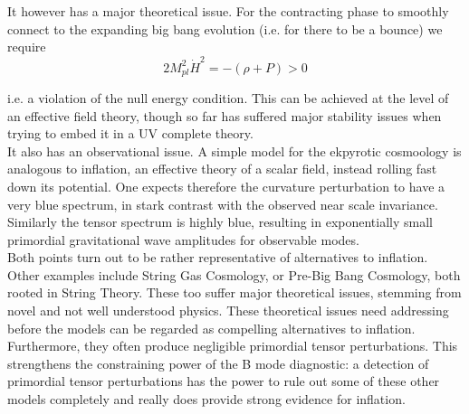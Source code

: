 \documentclass[a4paper,10pt]{article}
\newcommand{\Mp}{M_{pl}}
\begin{document}
It however has a major theoretical issue. For the contracting phase to smoothly connect to the expanding big bang evolution (i.e. for there to be a bounce) we require
\begin{equation}
2\Mp^2\dot{H}^2 = -(\rho + P) > 0
\end{equation} 

i.e. a violation of the null energy condition. This can be achieved at the level of an effective field theory, though so far has suffered major stability issues when trying to embed it in a UV complete theory.\\

It also has an observational issue. A simple model for the ekpyrotic cosmoology is analogous to inflation, an effective theory of a scalar field, instead rolling fast down its potential. One expects therefore the curvature perturbation to have a very blue spectrum, in stark contrast with the observed near scale invariance. Similarly the tensor spectrum is highly blue, resulting in exponentially small primordial gravitational wave amplitudes for observable modes. \\

Both points turn out to be rather representative of alternatives to inflation. Other examples include String Gas Cosmology, or Pre-Big Bang Cosmology, both rooted in String Theory. These too suffer major theoretical issues, stemming from novel and not well understood physics. These theoretical issues need addressing before the models can be regarded as compelling alternatives to inflation. Furthermore, they often produce negligible primordial tensor perturbations. This strengthens the constraining power of the B mode diagnostic: a detection of primordial tensor perturbations has the power to rule out some of these other models completely and really does provide strong evidence for inflation.

\end{document}
